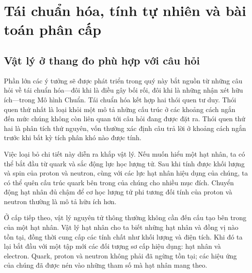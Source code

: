 \chapter{Tái chuẩn hóa, tính tự nhiên và bài toán phân cấp}


\section{Vật lý ở thang đo phù hợp với câu hỏi}

Phần lớn các ý tưởng sẽ được phát triển trong quý này bắt nguồn từ những câu hỏi về tái chuẩn hóa---đôi khi là điều gây bối rối, đôi khi là những nhận xét hữu ích---trong Mô hình Chuẩn. Tái chuẩn hóa kết hợp hai thói quen tư duy. Thói quen thứ nhất là loại khỏi một mô tả những cấu trúc ở các khoảng cách ngắn đến mức chúng không còn liên quan tới câu hỏi đang được đặt ra. Thói quen thứ hai là phân tích thứ nguyên, vốn thường xác định câu trả lời ở khoảng cách ngắn trước khi bất kỳ tích phân khó nào được tính.

Việc loại bỏ chi tiết này diễn ra khắp vật lý. Nếu muốn hiểu một hạt nhân, ta có thể bắt đầu từ quark và sắc động lực học lượng tử. Sau khi tính được khối lượng và spin của proton và neutron, cùng với các lực hạt nhân hiệu dụng của chúng, ta có thể quên cấu trúc quark bên trong của chúng cho nhiều mục đích. Chuyển động hạt nhân đủ chậm để cơ học lượng tử phi tương đối tính của proton và neutron thường là mô tả hữu ích hơn.

Ở cấp tiếp theo, vật lý nguyên tử thông thường không cần đến cấu tạo bên trong của một hạt nhân. Vật lý hạt nhân cho ta biết những hạt nhân và đồng vị nào tồn tại, đồng thời cung cấp các tính chất như khối lượng và điện tích. Khi đó ta lại bắt đầu với một tập mới các đối tượng sơ cấp hiệu dụng: hạt nhân và electron. Quark, proton và neutron không phải đã ngừng tồn tại; các hiệu ứng của chúng đã được nén vào những tham số mà hạt nhân mang theo.


